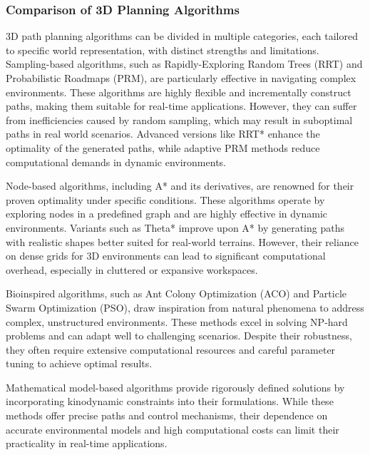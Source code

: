 \documentclass[12pt]{article}
\begin{document}
        
        
        \subsubsection{Comparison of 3D Planning Algorithms}

        3D path planning algorithms can be divided in multiple categories, each tailored to specific world representation, with distinct strengths and limitations. Sampling-based algorithms, such as Rapidly-Exploring Random Trees \cite{lavalle1998rapidly} (RRT) and Probabilistic Roadmaps\cite{kavraki1996probabilistic} (PRM), are particularly effective in navigating complex environments. These algorithms are highly flexible and incrementally construct paths, making them suitable for real-time applications. However, they can suffer from inefficiencies caused by random sampling, which may result in suboptimal paths in real world scenarios. Advanced versions like RRT* \cite{islam2012rrt} enhance the optimality of the generated paths, while adaptive PRM methods reduce computational demands in dynamic environments.
        
        Node-based algorithms, including A* and its derivatives, are renowned for their proven optimality under specific conditions. These algorithms operate by exploring nodes in a predefined graph and are highly effective in dynamic environments. Variants such as Theta* improve upon A* by generating paths with realistic shapes better suited for real-world terrains. However, their reliance on dense grids for 3D environments can lead to significant computational overhead, especially in cluttered or expansive workspaces.
        
        Bioinspired algorithms, such as Ant Colony Optimization (ACO) and Particle Swarm Optimization (PSO), draw inspiration from natural phenomena to address complex, unstructured environments. These methods excel in solving NP-hard problems and can adapt well to challenging scenarios. Despite their robustness, they often require extensive computational resources and careful parameter tuning to achieve optimal results.
        
        Mathematical model-based algorithms provide rigorously defined solutions by incorporating kinodynamic constraints into their formulations. While these methods offer precise paths and control mechanisms, their dependence on accurate environmental models and high computational costs can limit their practicality in real-time applications.
        
\end{document}

